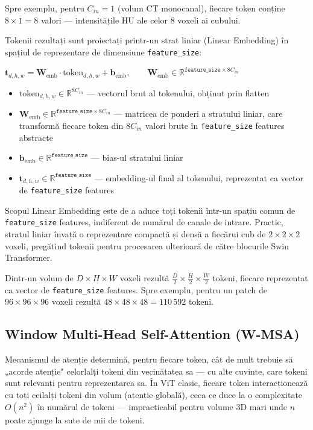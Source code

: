 \documentclass[12pt, a4paper]{report}
\newcommand{\formula}[1]{%
    \begin{center}
        \colorbox{codebackground}{%
            \parbox{0.88\textwidth}{\centering\vspace{4pt}$#1$\vspace{4pt}}%
        }
    \end{center}
}
\begin{document}
Spre exemplu, pentru $C_{in} = 1$ (volum CT monocanal), fiecare
token conține $8 \times 1 = 8$ valori — intensitățile HU ale celor
8 voxeli ai cubului.

Tokenii rezultați sunt proiectați printr-un strat liniar (Linear
Embedding) în spațiul de reprezentare de dimensiune
\texttt{feature\_size}:

\formula{
    \mathbf{t}_{d,h,w} = \mathbf{W}_{\text{emb}} \cdot
    \text{token}_{d,h,w} + \mathbf{b}_{\text{emb}},
    \qquad \mathbf{W}_{\text{emb}} \in \mathbb{R}^{\texttt{feature\_size} \times 8 C_{in}}
}

\begin{itemize}
    \item $\text{token}_{d,h,w} \in \mathbb{R}^{8 C_{in}}$ ---
    vectorul brut al tokenului, obținut prin flatten
    \item $\mathbf{W}_{\text{emb}} \in \mathbb{R}^{\texttt{feature\_size} \times 8 C_{in}}$
    --- matricea de ponderi a stratului liniar, care transformă fiecare
    token din $8 C_{in}$ valori brute în \texttt{feature\_size} features abstracte
    \item $\mathbf{b}_{\text{emb}} \in \mathbb{R}^{\texttt{feature\_size}}$ --- bias-ul
    stratului liniar
    \item $\mathbf{t}_{d,h,w} \in \mathbb{R}^{\texttt{feature\_size}}$ --- embedding-ul
    final al tokenului, reprezentat ca vector de \texttt{feature\_size} features
\end{itemize}

Scopul Linear Embedding este de a aduce toți tokenii într-un spațiu
comun de \texttt{feature\_size} features, indiferent de numărul de
canale de intrare. Practic, stratul liniar învață o reprezentare
compactă și densă a fiecărui cub de $2\times2\times2$ voxeli,
pregătind tokenii pentru procesarea ulterioară de către blocurile
Swin Transformer.

Dintr-un volum de $D \times H \times W$ voxeli rezultă
$\frac{D}{2} \times \frac{H}{2} \times \frac{W}{2}$ tokeni, fiecare
reprezentat ca vector de \texttt{feature\_size} features. Spre exemplu,
pentru un patch de $96\times96\times96$ voxeli rezultă
$48\times48\times48 = 110\,592$ tokeni.



\subsection{Window Multi-Head Self-Attention (W-MSA)}

Mecanismul de atenție determină, pentru fiecare token, cât de mult
trebuie să „acorde atenție" celorlalți tokeni din vecinătatea sa —
cu alte cuvinte, care tokeni sunt relevanți pentru reprezentarea sa.
În ViT clasic, fiecare token interacționează cu toți ceilalți tokeni
din volum (atenție globală), ceea ce duce la o complexitate
$O(n^2)$ în numărul de tokeni — impracticabil pentru volume 3D mari
unde $n$ poate ajunge la sute de mii de tokeni.
\end{document}
